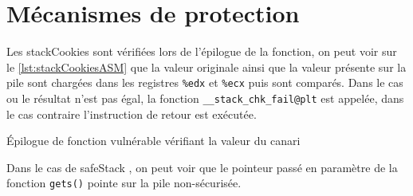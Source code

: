 \chapter{Mécanismes de protection}
\label{chap:mecanismeProtection}

Les \og \gls{stackCookies} \fg sont vérifiées lors de l'épilogue de la fonction, on
peut voir sur le \autoref{lst:stackCookiesASM} que la valeur originale ainsi que la
valeur présente sur la pile sont chargées dans les registres \texttt{\%edx} et
\texttt{\%ecx} puis sont comparés. Dans le cas ou le résultat n'est pas égal, la
fonction \texttt{\_\_stack\_chk\_fail@plt} est appelée, dans le cas contraire
l'instruction de retour est exécutée.

\begin{listing}
	\caption{Épilogue de fonction vulnérable vérifiant la valeur du canari}
	\label{lst:stackCookiesASM}
\end{listing}

Dans le cas de \og \gls{safeStack} \fg, on peut voir que le pointeur passé en paramètre
de la fonction \texttt{gets()} pointe sur la pile non-sécurisée.

\label{lst:safeStackASM}
